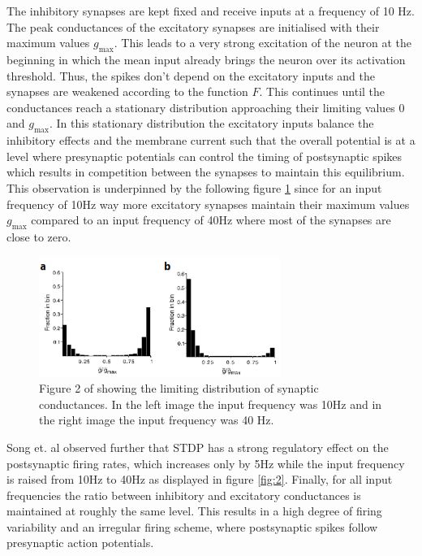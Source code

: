 The inhibitory synapses are kept fixed and receive inputs at a frequency of 10 Hz. The peak conductances of the excitatory synapses are initialised with their maximum values $g_{\max}$. This leads to a very strong excitation of the neuron at the beginning in which the mean input already brings the neuron over its activation threshold. Thus, the spikes don't depend on the excitatory inputs and the synapses are weakened according to the function $F$. This continues until the conductances reach a stationary distribution approaching their limiting values $0$ and $g_{\max}$. In this stationary distribution the excitatory inputs balance the inhibitory effects and the membrane current such that the overall potential is at a level where presynaptic potentials can control the timing of postsynaptic spikes which results in competition between the synapses to maintain this equilibrium.
This observation is underpinned by the following figure \ref{fig:1} since for an input frequency of 10Hz way more excitatory synapses maintain their maximum values $g_{\max}$ compared to an input frequency of 40Hz where most of the synapses are close to zero.
\begin{figure}[H]
	\centering	
	\includegraphics[width=0.7\textwidth]{CN2}
	\caption{Figure 2 of \cite{article} showing the limiting distribution of synaptic conductances. In the left image the input frequency was 10Hz and in the right image the input frequency was 40 Hz.}
	\label{fig:1}
\end{figure}
Song et. al observed further that STDP has a strong regulatory effect on the postsynaptic firing rates, which increases only by 5Hz while the input frequency is raised from 10Hz to 40Hz as displayed in figure \ref{fig:2}. Finally, for all input frequencies the ratio between inhibitory and excitatory conductances is maintained at roughly the same level. This results in a high degree of firing variability and an irregular firing scheme, where postsynaptic spikes follow presynaptic action potentials. 
